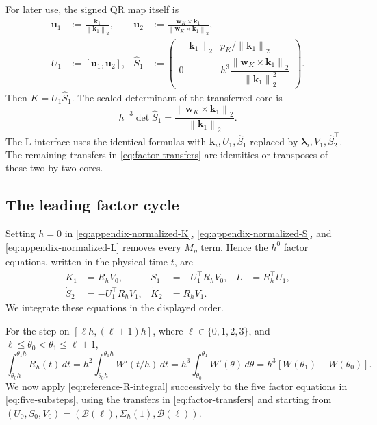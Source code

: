 \documentclass[]{article}
\numberwithin{equation}{section}
\theoremstyle{plain}
\theoremstyle{remark}
\newcommand{\norm}[1]{\left\lVert #1\right\rVert}
\begin{document}
For later use, the signed QR map itself is
\begin{align}
 \boldsymbol u_1&:=\frac{\boldsymbol k_1}{\norm{\boldsymbol k_1}_2},
 &\boldsymbol u_2&:=
 \frac{\boldsymbol w_K\times\boldsymbol k_1}
      {\norm{\boldsymbol w_K\times\boldsymbol k_1}_2},
 \label{eq:appendix-signed-QR-basis}\\
 U_1&:=[\boldsymbol u_1,\boldsymbol u_2],
 &\widehat S_1&:=
 \begin{pmatrix}
 \norm{\boldsymbol k_1}_2&p_K/\norm{\boldsymbol k_1}_2\\
 0&h^3
 \dfrac{\norm{\boldsymbol w_K\times\boldsymbol k_1}_2}
 {\norm{\boldsymbol k_1}_2^2}
 \end{pmatrix}.
 \label{eq:appendix-signed-QR-core}
\end{align}
Then \(K=U_1\widehat S_1\).  The scaled determinant of the
transferred core is
\begin{equation}\label{eq:appendix-signed-QR-determinant}
 h^{-3}\det\widehat S_1
 =\frac{\norm{\boldsymbol w_K\times\boldsymbol k_1}_2}
 {\norm{\boldsymbol k_1}_2}.
\end{equation}
The L-interface uses the identical formulas with
\(\boldsymbol k_i,U_1,\widehat S_1\) replaced by
\(\boldsymbol\lambda_i,V_1,\widehat S_2^\top\).  The remaining transfers
in \eqref{eq:factor-transfers} are identities or transposes of these
two-by-two cores.

\subsection{The leading factor cycle}
\label{app:leading-factor-cycle}

Setting $h=0$ in \eqref{eq:appendix-normalized-K},
\eqref{eq:appendix-normalized-S}, and
\eqref{eq:appendix-normalized-L} removes every $M_\eta$ term.  Hence the
$h^0$ factor equations, written in the physical time $t$, are
\begin{align*}
 \dot K_1&=R_hV_0,
 &\dot S_1&=-U_1^\top R_hV_0,
 &\dot L&=R_h^\top U_1,\\
 \dot S_2&=-U_1^\top R_hV_1,
 &\dot K_2&=R_hV_1.
\end{align*}
We integrate these equations in the displayed order.

For the step on $[\ell h,(\ell+1)h]$, where
$\ell\in\{0,1,2,3\}$, and
$\ell\le\theta_0<\theta_1\le\ell+1$,
\begin{equation}\label{eq:reference-R-integral}
 \int_{\theta_0h}^{\theta_1h}R_h(t)\,dt
 =h^2\int_{\theta_0h}^{\theta_1h}W'(t/h)\,dt
 =h^3\int_{\theta_0}^{\theta_1}W'(\theta)\,d\theta
 =h^3[W(\theta_1)-W(\theta_0)].
\end{equation}
We now apply \eqref{eq:reference-R-integral} successively to the five
factor equations in \eqref{eq:five-substeps}, using the transfers in
\eqref{eq:factor-transfers} and starting from
$(U_0,S_0,V_0)=(\mathcal B(\ell),\Sigma_h(1),\mathcal B(\ell))$.
\end{document}
